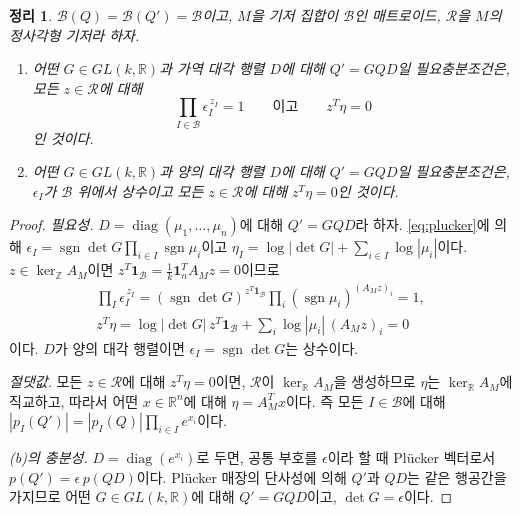 \documentclass[11pt,a4paper]{article}
\theoremstyle{plain}
\newtheorem{theorem}{정리}[section]
\theoremstyle{definition}
\newcommand{\R}{\mathbb R}
\newcommand{\Z}{\mathbb Z}
\newcommand{\AM}{A_M}
\newcommand{\kerZ}{\ker_{\Z}\!A_M}
\newcommand{\kerR}{\ker_{\R}\!A_M}
\newcommand{\bs}{\mathcal B}
\newcommand{\sgn}{\operatorname{sgn}}
\newcommand{\ind}{\mathbf 1}
\begin{document}
\begin{theorem}\label{thm:criterion}
$\bs(Q)=\bs(Q')=\bs$이고, $M$을 기저 집합이 $\bs$인 매트로이드, $\mathcal R$을 $M$의 정사각형 기저라 하자.
\begin{enumerate}[label=(\alph*),itemsep=1pt]
\item 어떤 $G\in GL(k,\R)$과 가역 대각 행렬 $D$에 대해 $Q'=GQD$일 필요충분조건은, 모든 $z\in\mathcal R$에 대해
\[
\prod_{I\in\bs}\epsilon_I^{\,z_I}=1\qquad\text{이고}\qquad z^{T}\eta=0
\]
인 것이다.
\item 어떤 $G\in GL(k,\R)$과 양의 대각 행렬 $D$에 대해 $Q'=GQD$일 필요충분조건은, $\epsilon_I$가 $\bs$ 위에서 상수이고 모든 $z\in\mathcal R$에 대해 $z^{T}\eta=0$인 것이다.
\end{enumerate}
\end{theorem}
\begin{proof}
\emph{필요성.} $D=\operatorname{diag}(\mu_1,\dots,\mu_n)$에 대해 $Q'=GQD$라 하자. \eqref{eq:plucker}에 의해 $\epsilon_I=\sgn\det G\prod_{i\in I}\sgn\mu_i$이고 $\eta_I=\log|\det G|+\sum_{i\in I}\log|\mu_i|$이다. $z\in\kerZ$이면 $z^{T}\ind_{\bs}=\tfrac1k\ind_n^{T}\AM z=0$이므로
\begin{gather*}
\prod_{I}\epsilon_I^{\,z_I}=(\sgn\det G)^{z^T\ind_{\bs}}\prod_i(\sgn\mu_i)^{(\AM z)_i}=1,\\
z^T\eta=\log|\det G|\, z^T\ind_{\bs}+\sum_i\log|\mu_i|\,(\AM z)_i=0
\end{gather*}
이다. $D$가 양의 대각 행렬이면 $\epsilon_I=\sgn\det G$는 상수이다.

\emph{절댓값.} 모든 $z\in\mathcal R$에 대해 $z^T\eta=0$이면, $\mathcal R$이 $\kerR$을 생성하므로 $\eta$는 $\kerR$에 직교하고, 따라서 어떤 $x\in\R^n$에 대해 $\eta=\AM^{T}x$이다. 즉 모든 $I\in\bs$에 대해 $|p_I(Q')|=|p_I(Q)|\prod_{i\in I}e^{x_i}$이다.

\emph{(b)의 충분성.} $D=\operatorname{diag}(e^{x_i})$로 두면, 공통 부호를 $\epsilon$이라 할 때 Plücker 벡터로서 $p(Q')=\epsilon\,p(QD)$이다. Plücker 매장의 단사성에 의해 $Q'$과 $QD$는 같은 행공간을 가지므로 어떤 $G\in GL(k,\R)$에 대해 $Q'=GQD$이고, $\det G=\epsilon$이다.


\end{proof}
\end{document}
